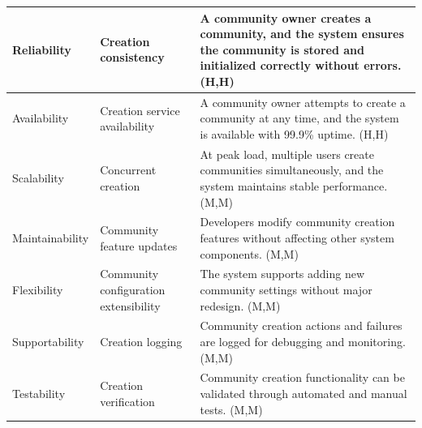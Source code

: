\documentclass{article}
\begin{document}
\begin{table}[H]
\begin{tabular}{|p{3cm}|p{4cm}|p{7cm}|}
        Reliability
                                   & Creation consistency
                                   & A community owner creates a community, and the system ensures the community is stored and initialized correctly without errors. (H,H)                            \\
        \hline

        Availability
                                   & Creation service availability
                                   & A community owner attempts to create a community at any time, and the system is available with 99.9\% uptime. (H,H)                                              \\
        \hline

        Scalability
                                   & Concurrent creation
                                   & At peak load, multiple users create communities simultaneously, and the system maintains stable performance. (M,M)                                               \\
        \hline

        Maintainability
                                   & Community feature updates
                                   & Developers modify community creation features without affecting other system components. (M,M)                                                                   \\
        \hline

        Flexibility
                                   & Community configuration extensibility
                                   & The system supports adding new community settings without major redesign. (M,M)                                                                                  \\
        \hline

        Supportability
                                   & Creation logging
                                   & Community creation actions and failures are logged for debugging and monitoring. (M,M)                                                                           \\
        \hline

        Testability
                                   & Creation verification
                                   & Community creation functionality can be validated through automated and manual tests. (M,M)                                                                      \\
        \hline
    \end{tabular}
\end{table}
\end{document}
